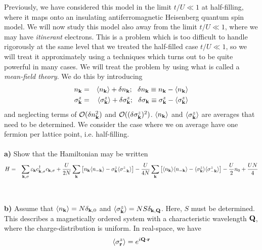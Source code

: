 \documentclass{article}
\begin{document}
Previously, we have considered this model in the limit $t/U \ll 1$ at half-filling, where it maps onto an insulating antiferromagnetic Heisenberg quantum spin model. We will now study this model also away from the limit $t/U \ll 1$, where we may have {\it itinerant} electrons. This is a problem which is too difficult to handle rigorously at the same level that we treated the half-filled case $t/U \ll 1$, so we will treat it approximately using a techniques which turns out to be quite powerful in many cases.  We will treat the problem by using what is called a {\it mean-field theory}. We do this by introducing 
\begin{eqnarray}
n_{\bf k} & = & \langle n_{\bf k} \rangle + \delta n_{\bf k}; ~~  \delta n_{\bf k} \equiv n_{\bf k} - \langle n_{\bf k} \rangle \nonumber  \\
\sigma^z_{\bf k} & = & \langle \sigma^z_{\bf k} \rangle + \delta \sigma^z_{\bf k}; ~~  \delta \sigma_{\bf k} \equiv \sigma^z_{\bf k} - \langle \sigma^z_{\bf k} \rangle \nonumber  
\end{eqnarray}
and neglecting terms of ${\cal O}(\delta n_{\bf k}^2) $ and  ${\cal O}((\delta \sigma^z_{\bf k})^2) $.
$\langle n_{\bf k} \rangle$  and $\langle \sigma^z_{\bf k} \rangle$ are averages that need to be determined. We consider the case where we on average have one fermion per lattice point, i.e. half-filling.
\ \\
\ \\
{\bf a)} Show that the Hamiltonian may be written 
\begin{eqnarray}
H & = & \sum_{{\bf k},\sigma}{ \varepsilon_{{\bf k}}}  c^{\dagger}_{{\bf k},\sigma} c_{{\bf k},\sigma}
+ \frac{U}{2N} \sum_{{\bf k}} 
\left[ n_{\bf k}  \langle n_{-\bf k} \rangle   - \sigma^z_{\bf k}  \langle \sigma^z_{-\bf k} \rangle  \right]  
 -   \frac{U}{4N} \sum_{{\bf k}} 
\left[ \langle n_{\bf k} \rangle  \langle  n_{-\bf k} \rangle   - \langle  \sigma^z_{\bf k} \rangle \langle \sigma^z_{-\bf k} \rangle  \right] 
- \frac{U}{2}  n_{0}
 +\frac{U N}{4}
 \nonumber
\end{eqnarray}
\ \\
\ \\
{\bf b)} Assume that $\langle n_{\bf k} \rangle = N \delta_{{\bf k},0}$ and $ \langle \sigma^z_{\bf k} \rangle =  N S \delta_{{\bf k},{\bf Q}}$. Here, $S$ must be determined. This describes a magnetically ordered system with a characteristic wavelength ${\bf Q}$, where the charge-distribution is uniform. In real-space, we have
\begin{eqnarray}
\langle \sigma^z_{\bf r} \rangle = e^{i {\bf Q} \cdot {\bf r}} \nonumber
\end{eqnarray}  
\end{document}
